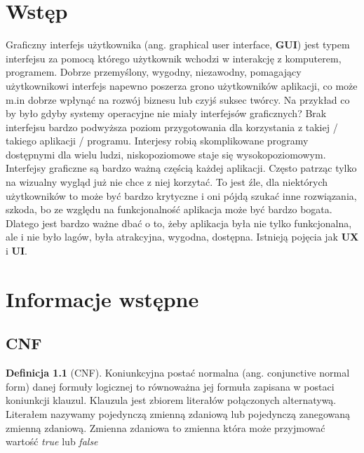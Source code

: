 \documentclass[a4paper,12pt,oneside]{book}
\theoremstyle{definition}
\newtheorem{definition}{Definicja}
\begin{document}


\tableofcontents{}

\chapter*{Wstęp}

 Graficzny interfejs użytkownika (ang. graphical user interface, \textbf{GUI}) jest typem interfejsu za pomocą którego użytkownik wchodzi w interakcję z komputerem, programem. Dobrze przemyślony, wygodny, niezawodny, pomagający użytkownikowi interfejs napewno poszerza grono użytkowników aplikacji, co może m.in dobrze wpłynąć na rozwój biznesu lub czyjś suksec twórcy. Na przykład co by było gdyby systemy operacyjne nie miały interfejsów graficznych? Brak interfejsu bardzo podwyższa poziom przygotowania dla korzystania z takiej / takiego aplikacji / programu. Interjesy robią skomplikowane programy dostępnymi dla wielu ludzi, niskopoziomowe staje się wysokopoziomowym. Interfejsy graficzne są bardzo ważną częścią każdej aplikacji. Często patrząc tylko na wizualny wygląd już nie chce z niej korzytać. To jest źle, dla niektórych użytkowników to może być bardzo krytyczne i oni pójdą szukać inne rozwiązania, szkoda, bo ze względu na funkcjonalność aplikacja może być bardzo bogata. Dlatego jest bardzo ważne dbać o to, żeby aplikacja była nie tylko funkcjonalna, ale i nie było lagów, była atrakcyjna, wygodna, dostępna. Istnieją pojęcia jak \textbf{UX} i \textbf{UI}. 

\chapter{Informacje wstępne}

\section{CNF}

\begin{definition}[CNF]
     Koniunkcyjna postać normalna (ang. conjunctive normal form) danej formuły logicznej to równoważna jej formuła zapisana w postaci koniunkcji klauzul. Klauzula jest zbiorem literałów połączonych alternatywą. Literałem nazywamy pojedynczą zmienną zdaniową lub pojedynczą zanegowaną zmienną zdaniową. Zmienna zdaniowa to zmienna która może przyjmować wartość \textit{true} lub \textit{false} 
\end{definition}
\end{document}
